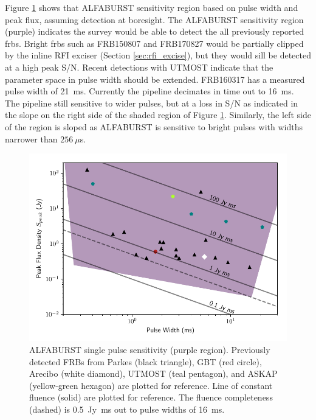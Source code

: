 \documentclass[a4paper,fleqn,usenatbib]{mnras}
\begin{document}
Figure \ref{fig:sensitivity_range} shows that ALFABURST sensitivity region based
on pulse width and peak flux, assuming detection at boresight. The ALFABURST
sensitivity region (purple) indicates the survey would be able to detect the all
previously reported \glspl{frb}. Bright \glspl{frb} such as FRB150807 and
FRB170827 would be partially clipped by the inline RFI exciser (Section
\ref{sec:rfi_excise}), but they would sill be detected at a high peak S/N.
Recent detections with UTMOST \citep{2017MNRAS.468.3746C,atel10697} indicate
that the parameter space in pulse width should be extended.  FRB160317 has a
measured pulse width of 21~ms. Currently the pipeline decimates in time out to
16~ms. The pipeline still sensitive to wider pulses, but at a loss in S/N as
indicated in the slope on the right side of the shaded region of Figure
\ref{fig:sensitivity_range}. Similarly, the left side of the region is sloped as
ALFABURST is sensitive to bright pulses with widths narrower than $256~\mu$s.

\begin{figure}
    \includegraphics[width=1.0\linewidth]{figures/sensitivity_range.pdf}
    \caption{ALFABURST single pulse sensitivity (purple region).
    Previously detected FRBs from Parkes (black triangle), GBT
    (red circle), Arecibo (white diamond), UTMOST (teal pentagon), and ASKAP
    (yellow-green hexagon) are plotted for reference. Line of constant fluence
    (solid) are plotted for reference. The fluence completeness (dashed) is
    0.5~Jy~ms out to pulse widths of 16~ms.
    }
    \label{fig:sensitivity_range}
\end{figure}
\end{document}
